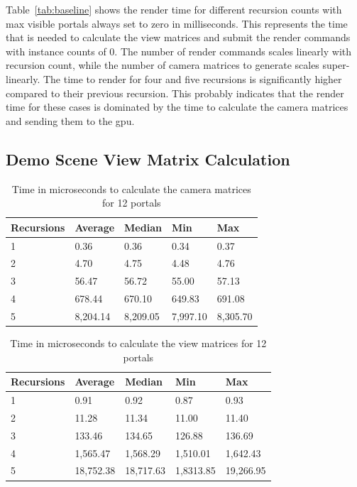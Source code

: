 Table~\ref{tab:baseline} shows the render time for different recursion counts with max visible portals always set to zero in milliseconds. This represents the time that is needed to calculate the view matrices and submit the render commands with instance counts of 0. The number of render commands scales linearly with recursion count, while the number of camera matrices to generate scales super-linearly. The time to render for four and five recursions is significantly higher compared to their previous recursion. This probably indicates that the render time for these cases is dominated by the time to calculate the camera matrices and sending them to the \gls{gpu}.

\subsection{Demo Scene View Matrix Calculation}
\label{section:perfmatrixcalc}

\begin{table}[H]
	\centering
	\begin{tabular}{|l|l|l|l|l|}
		\hline
		Recursions & Average & Median  & Min     & Max     \\ \hline
		1          & 0.36    & 0.36    & 0.34    & 0.37    \\ \hline
		2          & 4.70    & 4.75    & 4.48    & 4.76    \\ \hline
		3          & 56.47   & 56.72   & 55.00   & 57.13   \\ \hline
		4          & 678.44  & 670.10  & 649.83  & 691.08  \\ \hline
		5          & 8,204.14 & 8,209.05 & 7,997.10 & 8,305.70\\ \hline
	\end{tabular}
	\caption{Time in microseconds to calculate the camera matrices for 12 portals}
	\label{tab:cameramatricecalc}
\end{table}

\begin{table}[H]
	\centering
	\begin{tabular}{|l|l|l|l|l|}
		\hline
		Recursions & Average   & Median  	& Min     	& Max        \\ \hline
		1          & 0.91      & 0.92		& 0.87    	& 0.93       \\ \hline
		2          & 11.28     & 11.34		& 11.00    	& 11.40      \\ \hline
		3          & 133.46    & 134.65		& 126.88   	& 136.69     \\ \hline
		4          & 1,565.47  & 1,568.29	& 1,510.01  & 1,642.43   \\ \hline
		5          & 18,752.38 & 18,717.63	& 1,8313.85 & 19,266.95 \\ \hline
	\end{tabular}
	\caption{Time in microseconds to calculate the view matrices for 12 portals}
	\label{tab:cameramatricecalcinverse}
\end{table}

